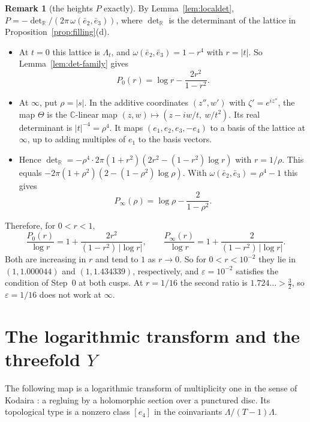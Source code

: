 \documentclass{article}
\theoremstyle{definition}
\newtheorem{remark}[theorem]{Remark}
\theoremstyle{plain}
\newcommand{\R}{\mathbb{R}}
\newcommand{\C}{\mathbb{C}}
\newcommand{\eb}{\bar e}
\begin{document}
\begin{remark}[the heights $P$ exactly]\label{rem:Pexact}
By Lemma~\ref{lem:localdet}, $P=-\det_\R/(2\pi\,\omega(\eb_2,\eb_3))$, where $\det_\R$ is
the determinant of the lattice in Proposition~\ref{prop:filling}(d).
\begin{itemize}
\item At $t=0$ this lattice is $\Lambda_t$, and $\omega(\eb_2,\eb_3)=1-r^4$ with $r=|t|$.
  So Lemma~\ref{lem:det-family} gives
  \[P_0(r)=\log r-\frac{2r^2}{1-r^2}.\]
\item At $\infty$, put $\rho=|s|$. In the additive coordinates $(z'',w')$ with
  $\zeta'=e^{iz''}$, the map $\Theta$ is the $\C$-linear map
  $(z,w)\mapsto(z-iw/t,\ w/t^2)$. Its real determinant is $|t|^{-4}=\rho^4$. It maps
  $(e_1,e_2,e_3,-e_4)$ to a basis of the lattice at $\infty$, up to adding multiples of
  $e_1$ to the basis vectors.
\item Hence $\det_\R=-\rho^4\cdot2\pi(1+r^2)(2r^2-(1-r^2)\log r)$ with $r=1/\rho$. This
  equals $-2\pi(1+\rho^2)(2-(1-\rho^2)\log\rho)$. With $\omega(\eb_2,\eb_3)=\rho^4-1$
  this gives
  \[P_\infty(\rho)=\log\rho-\frac{2}{1-\rho^2}.\]
\end{itemize}
Therefore, for $0<r<1$,
\[\frac{P_0(r)}{\log r}=1+\frac{2r^2}{(1-r^2)\,|\log r|},\qquad
\frac{P_\infty(r)}{\log r}=1+\frac{2}{(1-r^2)\,|\log r|}.\]
Both are increasing in $r$ and tend to $1$ as $r\to0$. So for $0<r<10^{-2}$ they lie in
$(1,1.000044)$ and $(1,1.434339)$, respectively, and $\varepsilon=10^{-2}$ satisfies
the condition of Step~0 at both cusps. At $r=1/16$ the second ratio is $1.724\ldots>\tfrac32$,
so $\varepsilon=1/16$ does not work at $\infty$.
\end{remark}

\section{The logarithmic transform and the threefold $Y$}\label{sec:twist}

The following map is a logarithmic transform of multiplicity one in the sense of
Kodaira \cite{Kodaira63}: a regluing by a holomorphic section over a punctured disc.
Its topological type is a nonzero class $[e_4]$ in the coinvariants
$\Lambda/(T-1)\Lambda$.
\end{document}
